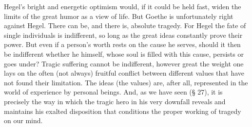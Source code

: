 \documentclass[12pt]{book}
\begin{document}
Hegel's bright and energetic optimism would, if it could be held fast, widen the limits of
the great humor as a view of life. But Goethe is unfortunately right against Hegel. There
can be, and there is, absolute tragedy. For Hegel the fate of single individuals is
indifferent, so long as the great ideas constantly prove their power. But even if a
person's worth rests on the cause he serves, should it then be indifferent whether he
himself, whose soul is filled with this cause, persists or goes under? Tragic suffering
cannot be indifferent, however great the weight one lays on the often (not always)
fruitful conflict between different values that have not found their limitation. The
ideas (the values) are, after all, represented in the world of experience by personal
beings. And, as we have seen (§ 27), it is precisely the way in which the tragic hero in
his very downfall reveals and maintains his exalted disposition that conditions the proper
working of tragedy on our mind.
\end{document}
